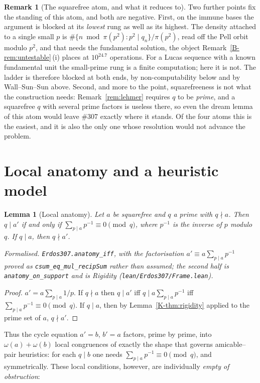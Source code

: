 \documentclass[11pt]{article}
\newtheorem{lemma}[theorem]{Lemma}
\theoremstyle{definition}
\newtheorem{remark}[theorem]{Remark}
\begin{document}
\begin{remark}[The squarefree atom, and what it reduces to]
Two further points fix the standing of this atom, and both are negative. First, on the immune bases
the argument is blocked at its \emph{lowest} rung as well as its highest. The density attached to a
single small $p$ is $\#\{n\bmod\pi(p^2):p^2\mid q_n\}/\pi(p^2)$, read off the Pell orbit modulo
$p^2$, and that needs the fundamental solution, the object Remark~\ref{B-rem:untestable}\,(i) places
at $10^{24.7}$ operations. For a Lucas sequence with a known fundamental unit the small-prime rung is
a finite computation; here it is not. The ladder is therefore blocked at both ends, by
non-computability below and by Wall--Sun--Sun above. Second, and more to the point, squarefreeness is
not what the construction needs: Remark~\ref{rem:lehmer} requires $q$ to be \emph{prime}, and a
squarefree $q$ with several prime factors is useless there, so even the dream lemma of this atom
would leave \#307 exactly where it stands. Of the four atoms this is the easiest, and it is also the
only one whose resolution would not advance the problem.
\end{remark}

\section{Local anatomy and a heuristic model}\label{sec:anatomy}

\begin{lemma}[Local anatomy]\label{lem:anatomy}
Let $a$ be squarefree and $q$ a prime with $q\nmid a$. Then $q\mid a'$ if and only if
$\sum_{p\mid a}p^{-1}\equiv 0\pmod q$, where $p^{-1}$ is the inverse of $p$ modulo $q$. If $q\mid a$,
then $q\nmid a'$.

\textup{Formalised.} \texttt{Erdos307.anatomy\_iff}, with the factorisation
$a'\equiv a\sum_{p\mid a}p^{-1}$ proved as \texttt{csum\_eq\_mul\_recipSum} rather than assumed; the
second half is \texttt{anatomy\_on\_support} and is Rigidity
\textup{(\texttt{lean/Erdos307/Frame.lean})}.
\end{lemma}
\begin{proof}
$a'=a\sum_{p\mid a}1/p$. If $q\nmid a$ then $q\mid a'$ iff $q\mid a\sum_{p\mid a}p^{-1}$ iff
$\sum_{p\mid a}p^{-1}\equiv0\pmod q$. If $q\mid a$, then by Lemma~\ref{K-thm:rigidity}
applied to the prime set of $a$, $q\nmid a'$.
\end{proof}

Thus the cycle equation $a'=b$, $b'=a$ factors, prime by prime, into
$\omega(a)+\omega(b)$ local congruences of exactly the shape that governs amicable--pair heuristics:
for each $q\mid b$ one needs $\sum_{p\mid a}p^{-1}\equiv0\pmod q$, and symmetrically. These local
conditions, however, are individually \emph{empty of obstruction}:
\end{document}
